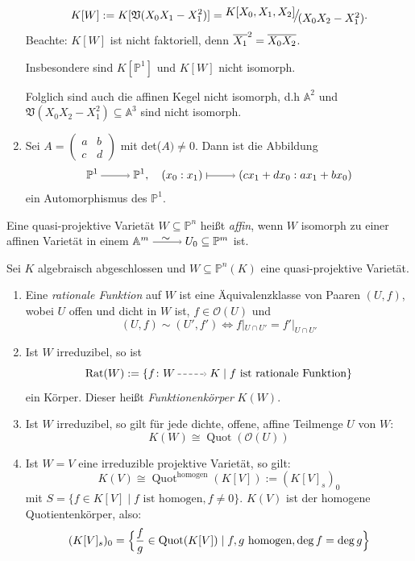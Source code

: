 \documentclass[a4paper,12pt]{scrbook}
\theoremstyle{keinenummern} %
\theoremstyle{mitnummern}
\theoremstyle{unserbeweis}
\def\A{\mathbb{A}}
\def\V{\mathfrak{V}}
\def\O{\mathcal{O}}
\def\P{\mathbb{P}}
\newcommand{\Rat}{\mathrm{Rat}}
\newcommand{\Quot}{\operatorname{Quot}}
\newcommand{\restrict}[1]{|_{#1}}
\newcommand{\ra}{\raisebox{-1pt}{\tikz{\draw[thin,shorten >=3pt, ->] (0,0) node{\hspace*{-2pt}} -- node{} (1,0);}}\penalty1000\relax}
\renewcommand{\mapsto}{\raisebox{-1pt}{\tikz{\draw[thin,shorten >=3pt, |->] (0,0) node{\hspace*{0pt}} -- node{} (1,0);}}\penalty1000\relax}
\newcommand{\isom}{\raisebox{-1pt}{\tikz{\draw[thin,shorten >=3pt, ->] (0,0) node{\hspace*{0pt}} -- node{} (1,0);\draw (0.4,0.1)
    node {$\sim$};}}\penalty1000\relax}
\newcommand{\ppf}{\raisebox{-1pt}{\tikz{\draw[densely dashed,thin,shorten >=3pt, ->] (0,0) node{\hspace*{-2pt}} -- node{} (1,0);}}\penalty1000\relax}
\def\Bar#1{\ensuremath\overline{#1}}
\newcommand{\Quotient}[2]{
  \mathchoice
  { %
    \raisebox{0.7ex}{\ensuremath{#1}}
    \ensuremath{\mkern-3mu}\big/\ensuremath{\mkern-3mu}
    \raisebox{-0.6ex}{\ensuremath{#2}}
  }
  { %
    #1/#2
  }
  { %
    #1/#2
  }
  { %
    #1/#2
  }
}
\begin{document}
\begin{bsp}
\begin{enumerate}
\[K[W]:=K[\V(X_0X_1-X_1^2)]=\Quotient{K[X_0,X_1,X_2]}{(X_0X_2-X_1^2)}.\]
Beachte: $K[W]$ ist nicht faktoriell, denn $\Bar{X_1}^2=\Bar{X_0X_2}$.

Insbesondere sind $K[\P^1]$ und $K[W]$ nicht isomorph.

Folglich sind auch die affinen Kegel nicht isomorph, d.h $\A^2$ und $\V(X_0X_2-X_1^2)\subseteq \A^3$ sind nicht isomorph.
  \item{} Sei $A=\begin{pmatrix} a&b\\c&d \end{pmatrix}$ mit det($A)\neq 0$. Dann ist die Abbildung 
\[\P^1\ra \P^1, \quad (x_0:x_1)\mapsto (cx_1+dx_0:ax_1+bx_0)\]
ein Automorphismus des $\P^1$.
\end{enumerate}
\end{bsp}

\begin{dfn}\label{2.6.4}
Eine quasi-projektive Varietät $W\subseteq \P^n$ heißt \emph{affin}, wenn $W$ isomorph zu einer affinen Varietät in einem $\A^m \isom U_0\subseteq \P^m$ ist.
\end{dfn}

\begin{db}\label{2.6.5}
 Sei $K$ algebraisch abgeschlossen und $W\subseteq \P^n(K)$ eine quasi-projektive Varietät.
\begin{enumerate}
  \item{} Eine \emph{rationale Funktion} auf $W$ ist eine Äquivalenzklasse von Paaren $(U,f)$, wobei $U$ offen und dicht in $W$ ist, $f\in \O(U)$ und
  \[(U,f)\sim (U',f') \iff f\restrict{U\cap U'}=f'\restrict{U\cap U'}\]
  \item{} Ist $W$ irreduzibel, so ist 
  \[\Rat(W):=\{f\colon W \ppf K \mid f \text{ ist rationale Funktion}\}\]
  ein Körper. Dieser heißt \emph{Funktionenkörper} $K(W)$. 
  \item{} Ist $W$ irreduzibel, so gilt für jede dichte, offene, affine Teilmenge $U$ von $W$:
\[K(W)\cong \Quot(\O(U))\]
  \item{} Ist $W=V$ eine irreduzible projektive Varietät, so gilt:
\[K(V)\cong \Quot^{\mathrm{homogen}}(K[V]):=(K[V]_s)_0\] 
mit $S=\{f\in K[V] \mid f \text{ ist homogen}, f\neq 0 \}$. $K(V)$ ist der homogene Quotientenkörper, also:
\[(K[V]_s)_0=\Bigl\{\frac{f}{g} \in \Quot(K[V]) \mid f,g \text{ homogen}, \deg f=\deg g\Bigr\}\]
\end{enumerate}
\end{db}
\end{document}
